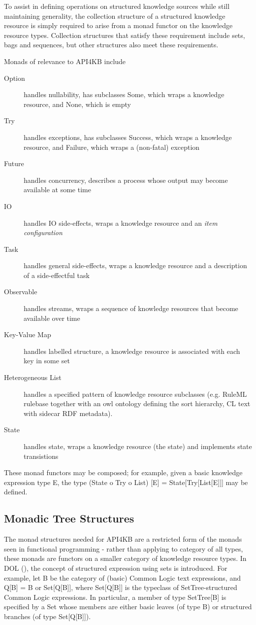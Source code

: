 \documentclass[runningheads]{llncs}
\begin{document}
To assist in defining operations on structured knowledge sources while still maintaining generality, the collection structure of a structured knowledge resource is simply required to arise from a monad functor on the knowledge resource types. Collection structures that satisfy these requirement include sets, bags and sequences, but other structures also meet these requirements.

Monads of relevance to API4KB include
\begin{description}
\item [Option] handles nullability, has subclasses Some, which wraps a knowledge resource, and None, which is empty
\item [Try] handles exceptions, has subclasses Success, which wraps a knowledge resource, and Failure, which wraps a (non-fatal) exception
\item [Future] handles concurrency, describes a process whose output may become available at some time
\item [IO] handles IO side-effects, wraps a knowledge resource and an \emph{item configuration}
\item [Task] handles general side-effects, wraps a knowledge resource and a description of a side-effectful task
\item [Observable] handles streams, wraps a sequence of knowledge resources that become available over time
\item [Key-Value Map] handles labelled structure, a knowledge resource is associated with each key in some set
\item [Heterogeneous List] handles a specified pattern of knowledge resource subclasses (e.g. RuleML rulebase together with an owl ontology defining the sort hierarchy, CL text with sidecar RDF metadata).
\item [State] handles state, wraps a knowledge resource (the state) and implements state transistions
\end{description}
These monad functors may be composed; for example, given a basic knowledge expression type E, the type (State o Try o List) [E] = State[Try[List[E]]] may be defined.


\subsection{Monadic Tree Structures}
The monad structures needed for API4KB are a restricted form of the monads seen in functional programming - rather than applying to category of all types, these monads are functors on a smaller category of knowledge resource types. In DOL (), the concept of structured expression using sets is introduced. For example, let B be the category of (basic) Common Logic text expressions, and Q[B] = B or Set[Q[B]], where Set[Q[B]] is the typeclass of SetTree-structured Common Logic expressions. In particular, a member of type SetTree[B] is specified by a Set whose members are either  basic leaves (of type B) or structured branches (of type Set[Q[B]]). 
\end{document}
